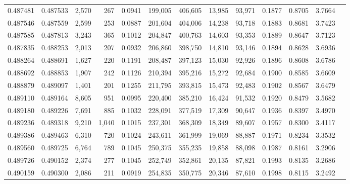 \begin{tabular}{rrrrrrrrrrrrr}
0.487481 & 0.487533 & 2,570 &   267 &                                     0.0941 & 199,005 & 406,605 &  13,985 &  93,971 & 0.1877 & 0.8705 & 3.7664 \\
0.487546 & 0.487559 & 2,599 &   253 &                                     0.0887 & 201,604 & 404,006 &  14,238 &  93,718 & 0.1883 & 0.8681 & 3.7423 \\
0.487585 & 0.487813 & 3,243 &   365 &                                     0.1012 & 204,847 & 400,763 &  14,603 &  93,353 & 0.1889 & 0.8647 & 3.7123 \\
0.487835 & 0.488253 & 2,013 &   207 &                                     0.0932 & 206,860 & 398,750 &  14,810 &  93,146 & 0.1894 & 0.8628 & 3.6936 \\
0.488264 & 0.488691 & 1,627 &   220 &                                     0.1191 & 208,487 & 397,123 &  15,030 &  92,926 & 0.1896 & 0.8608 & 3.6786 \\
0.488692 & 0.488853 & 1,907 &   242 &                                     0.1126 & 210,394 & 395,216 &  15,272 &  92,684 & 0.1900 & 0.8585 & 3.6609 \\
0.488879 & 0.489097 & 1,401 &   201 &                                     0.1255 & 211,795 & 393,815 &  15,473 &  92,483 & 0.1902 & 0.8567 & 3.6479 \\
0.489110 & 0.489164 & 8,605 &   951 &                                     0.0995 & 220,400 & 385,210 &  16,424 &  91,532 & 0.1920 & 0.8479 & 3.5682 \\
0.489180 & 0.489226 & 7,691 &   885 &                                     0.1032 & 228,091 & 377,519 &  17,309 &  90,647 & 0.1936 & 0.8397 & 3.4970 \\
0.489236 & 0.489318 & 9,210 & 1,040 &                                     0.1015 & 237,301 & 368,309 &  18,349 &  89,607 & 0.1957 & 0.8300 & 3.4117 \\
0.489386 & 0.489463 & 6,310 &   720 &                                     0.1024 & 243,611 & 361,999 &  19,069 &  88,887 & 0.1971 & 0.8234 & 3.3532 \\
0.489560 & 0.489725 & 6,764 &   789 &                                     0.1045 & 250,375 & 355,235 &  19,858 &  88,098 & 0.1987 & 0.8161 & 3.2906 \\
0.489726 & 0.490152 & 2,374 &   277 &                                     0.1045 & 252,749 & 352,861 &  20,135 &  87,821 & 0.1993 & 0.8135 & 3.2686 \\
0.490159 & 0.490300 & 2,086 &   211 &                                     0.0919 & 254,835 & 350,775 &  20,346 &  87,610 & 0.1998 & 0.8115 & 3.2492 \\

\end{tabular}
